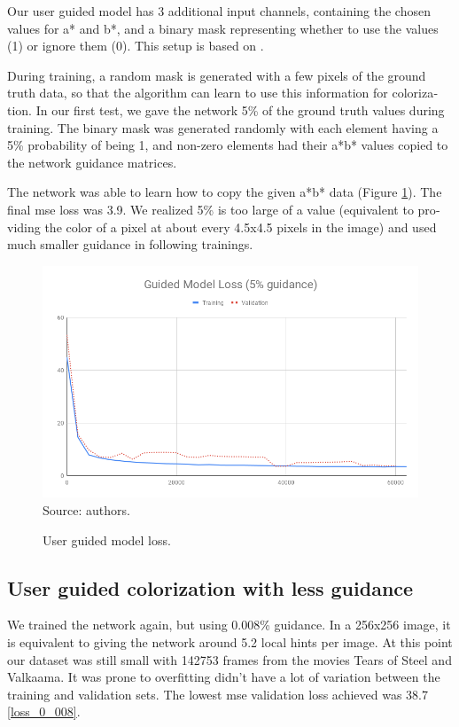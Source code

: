 \documentclass[12pt,openright,oneside,a4paper,english, brazilian]{abntex2}
\begin{document}
\begin{otherlanguage}{english}
Our user guided model has 3 additional input channels, containing the chosen values for a* and b*, and a binary mask representing whether to use the values (1) or ignore them (0). This setup is based on \cite{Zhang2017}.

During training, a random mask is generated with a few pixels of the ground truth data, so that the algorithm can learn to use this information for colorization. In our first test, we gave the network 5\% of the ground truth values during training. The binary mask was generated randomly with each element having a 5\% probability of being 1, and non-zero elements had their a*b* values copied to the network guidance matrices.

The network was able to learn how to copy the given a*b* data (Figure \ref{loss_5}). The final \acrshort{mse} loss was 3.9. We realized 5\% is too large of a value (equivalent to providing the color of a pixel at about every 4.5x4.5 pixels in the image) and used much smaller guidance in following trainings.

\begin{figure}[!htb]
\centering
\caption{User guided model loss.}
\includegraphics[width=\textwidth]{loss/Guided_5}
Source: authors.
\label{loss_5}
\end{figure}

\subsection{User guided colorization with less guidance}

We trained the network again, but using 0.008\% guidance. In a 256x256 image, it is equivalent to giving the network around 5.2 local hints per image. At this point our dataset was still small with 142753 frames from the movies Tears of Steel and Valkaama. It was prone to overfitting didn't have a lot of variation between the training and validation sets. The lowest \acrshort{mse} validation loss achieved  was 38.7 \ref{loss_0_008}.


\end{otherlanguage}
\end{document}

